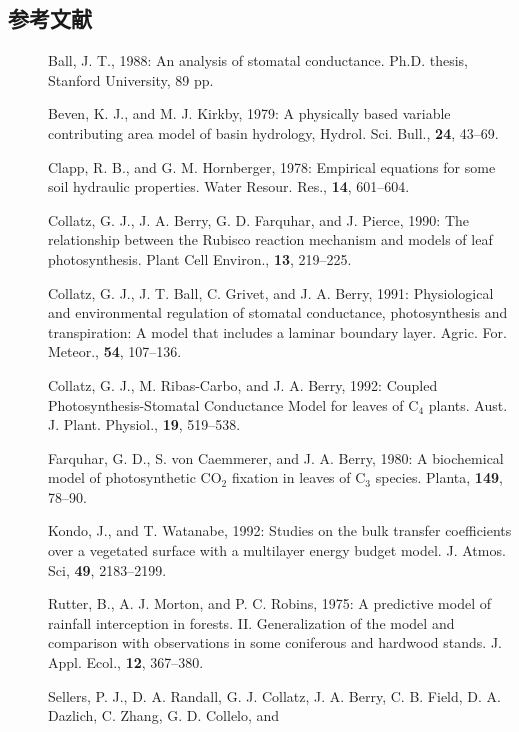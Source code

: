 \subsection*{参考文献}

\begin{description}
 \item[] Ball, J. T., 1988: An analysis of stomatal
	    conductance. Ph.D. thesis, Stanford University, 89 pp.
 \item[] Beven, K. J., and M. J. Kirkby, 1979: A physically based
	    variable contributing area model of basin hydrology,
	    {Hydrol. Sci. Bull.}, {\bf 24}, 43--69.
 \item[] Clapp, R. B., and G. M. Hornberger, 1978: Empirical equations
	    for some soil hydraulic properties. {Water Resour. Res.},
	    {\bf 14}, 601--604.
 \item[] Collatz, G. J., J. A. Berry, G. D. Farquhar, and J. Pierce,
	    1990: The relationship between the Rubisco reaction
	    mechanism and models of leaf photosynthesis. {Plant Cell
	    Environ.}, {\bf 13}, 219--225.
 \item[] Collatz, G. J., J. T. Ball, C. Grivet, and J. A. Berry, 1991:
	    Physiological and environmental regulation of stomatal
	    conductance, photosynthesis and transpiration: A model that
	    includes a laminar boundary layer. {Agric. For. Meteor.},
	    {\bf 54}, 107--136.
 \item[] Collatz, G. J., M. Ribas-Carbo, and J. A. Berry, 1992: Coupled
	    Photosynthesis-Stomatal Conductance Model for leaves of
	    C$_4$ plants. {Aust. J. Plant. Physiol.}, {\bf 19},
	    519--538.
 \item[] Farquhar, G. D., S. von Caemmerer, and J. A. Berry, 1980: A
	    biochemical model of photosynthetic CO$_2$ fixation in
	    leaves of C$_3$ species. {Planta}, {\bf 149}, 78--90.
 \item[] Kondo, J., and T. Watanabe, 1992: Studies on the bulk transfer
	    coefficients over a vegetated surface with a multilayer
	    energy budget model. {J. Atmos. Sci}, {\bf 49}, 2183--2199.
 \item[] Rutter, B., A. J. Morton, and P. C. Robins, 1975: A predictive
	    model of rainfall interception in forests. II.
	    Generalization of the model and comparison with observations
	    in some coniferous and hardwood stands. {J. Appl. Ecol.},
	    {\bf 12}, 367--380.
 \item[] Sellers, P. J., D. A. Randall, G. J. Collatz, J. A. Berry,
	    C. B. Field, D. A. Dazlich, C. Zhang, G. D. Collelo, and

\end{description}

